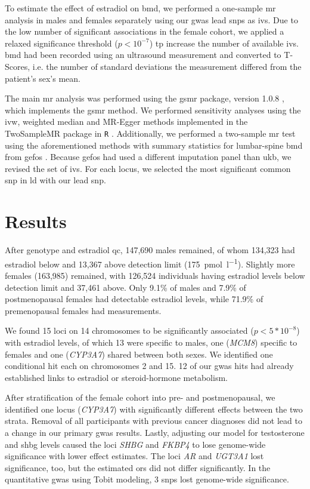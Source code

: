 \documentclass[draft]{scrbook}
\begin{document}
To estimate the effect of estradiol on \gls{bmd}, we performed a one-sample \gls{mr} analysis in males and females separately using our \gls{gwas} lead \glspl{snp} as \glspl{iv}.
Due to the low number of significant associations in the female cohort, we applied a relaxed significance threshold ($p < 10^{-7}$) tp increase the number of available \glspl{iv}.
\Gls{bmd} had been recorded using an ultrasound measurement and converted to T-Scores, i.e. the number of standard deviations the measurement differed from the patient's sex's mean. 

The main \gls{mr} analysis was performed using the \textsf{gsmr} package, version 1.0.8 \cite{Zhu2018}, which implements the \gls{gsmr} method.
We performed sensitivity analyses using the \gls{ivw}, weighted median and MR-Egger methods implemented in the \textsf{TwoSampleMR} package in \texttt{R} \cite{Hemani2018}.
Additionally, we performed a two-sample \gls{mr} test using the aforementioned methods with summary statistics for lumbar-spine \gls{bmd} from \gls{gefos} \cite{Estrada2012}.
Because \gls{gefos} had used a different imputation panel than \gls{ukb}, we revised the set of \glspl{iv}.
For each locus, we selected the most significant common \gls{snp} in \gls{ld} with our lead \gls{snp}.

\section{Results}

After genotype and estradiol \gls{qc}, 147,690 males remained, of whom 134,323 had estradiol below and 13,367 above detection limit (\qty{175}{\pmol\per\l}).
Slightly more females (163,985) remained, with 126,524 individuals having estradiol levels below detection limit and 37,461 above.
Only 9.1\% of males and 7.9\% of postmenopausal females had detectable estradiol levels, while 71.9\% of premenopausal females had measurements.

We found 15 loci on 14 chromosomes to be significantly associated ($p < 5*10^{-8}$) with estradiol levels, of which 13 were specific to males, one (\textit{MCM8}) specific to females and one (\textit{CYP3A7}) shared between both sexes.
We identified one conditional hit each on chromosomes 2 and 15.
12 of our \gls{gwas} hits had already established links to estradiol or steroid-hormone metabolism.

After stratification of the female cohort into pre- and postmenopausal, we identified one locus (\textit{CYP3A7}) with significantly different effects between the two strata.
Removal of all participants with previous cancer diagnoses did not lead to a change in our primary \gls{gwas} results.
Lastly, adjusting our model for testosterone and \gls{shbg} levels caused the loci \textit{SHBG} and \textit{FKBP4} to lose genome-wide significance with lower effect estimates.
The loci \textit{AR} and \textit{UGT3A1} lost significance, too, but the estimated \glspl{or} did not differ significantly.
In the quantitative \gls{gwas} using Tobit modeling, 3 \glspl{snp} lost genome-wide significance.
\end{document}
